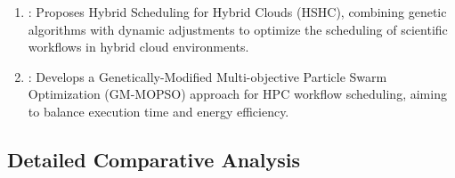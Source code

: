 \documentclass[a4paper, final]{article}
\begin{document}
\begin{enumerate}
\item \cite{bib:9}: Proposes Hybrid Scheduling for Hybrid Clouds (HSHC), combining genetic 
algorithms with dynamic adjustments to optimize the scheduling of scientific workflows in hybrid 
cloud environments.

\item  \cite{bib:10}: Develops a Genetically-Modified Multi-objective Particle Swarm Optimization 
(GM-MOPSO) approach for HPC workflow scheduling, aiming to balance execution time and energy efficiency.
\end{enumerate}

\subsection{Detailed Comparative Analysis}

    
    
    
\end{document}
